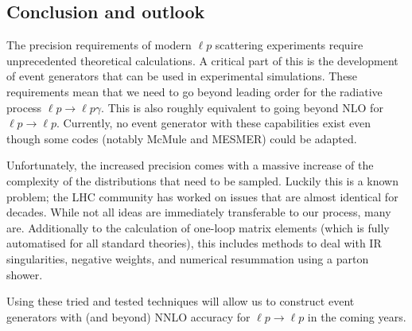 \subsection{Conclusion and outlook}

The precision requirements of modern $\ell p$ scattering experiments require unprecedented theoretical calculations.
A critical part of this is the development of event generators that can be used in experimental simulations.
These requirements mean that we need to go beyond leading order for the radiative process $\ell p\to \ell p\gamma$. This is also roughly equivalent to going beyond NLO for $\ell p\to \ell p$.
Currently, no event generator with these capabilities exist even though some codes (notably {\sc McMule} and {\sc MESMER}) could be adapted.

Unfortunately, the increased precision comes with a massive increase of the complexity of the distributions that need to be sampled.
Luckily this is a known problem;
the LHC community has worked on issues that are almost identical for decades.
While not all ideas are immediately transferable to our process, many are.
Additionally to the calculation of one-loop matrix elements (which is fully automatised for all standard theories), this includes methods to deal with IR singularities, negative weights, and numerical resummation using a parton shower.

Using these tried and tested techniques will allow us to construct event generators with (and beyond) NNLO accuracy for $\ell p\to \ell p$ in the coming years.
